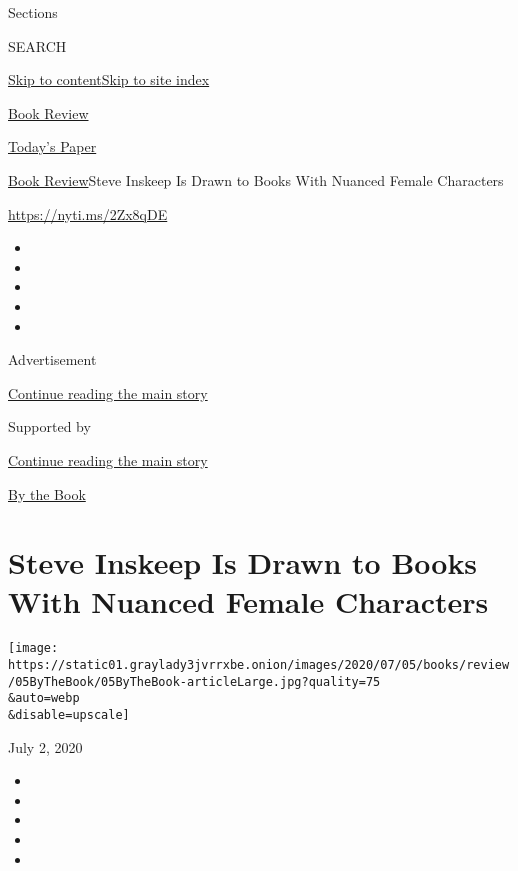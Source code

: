 Sections

SEARCH

\protect\hyperlink{site-content}{Skip to
content}\protect\hyperlink{site-index}{Skip to site index}

\href{https://www.nytimes3xbfgragh.onion/section/books/review}{Book
Review}

\href{https://myaccount.nytimes3xbfgragh.onion/auth/login?response_type=cookie\&client_id=vi}{}

\href{https://www.nytimes3xbfgragh.onion/section/todayspaper}{Today's
Paper}

\href{/section/books/review}{Book Review}\textbar{}Steve Inskeep Is
Drawn to Books With Nuanced Female Characters

\url{https://nyti.ms/2Zx8qDE}

\begin{itemize}
\item
\item
\item
\item
\item
\end{itemize}

Advertisement

\protect\hyperlink{after-top}{Continue reading the main story}

Supported by

\protect\hyperlink{after-sponsor}{Continue reading the main story}

\href{/column/by-the-book}{By the Book}

\hypertarget{steve-inskeep-is-drawn-to-books-with-nuanced-female-characters}{%
\section{Steve Inskeep Is Drawn to Books With Nuanced Female
Characters}\label{steve-inskeep-is-drawn-to-books-with-nuanced-female-characters}}

\texttt{[image: https://static01.graylady3jvrrxbe.onion/images/2020/07/05/books/review/05ByTheBook/05ByTheBook-articleLarge.jpg?quality=75\\\&auto=webp\\\&disable=upscale]}

July 2, 2020

\begin{itemize}
\item
\item
\item
\item
\item
\end{itemize}

